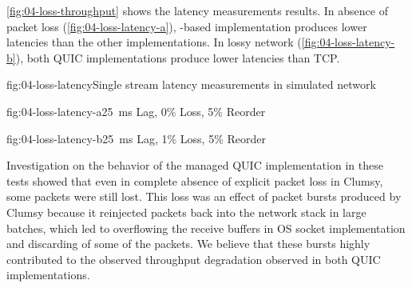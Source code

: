\autoref{fig:04-loss-throughput} shows the latency measurements results. In absence of packet loss
(\autoref{fig:04-loss-latency-a}), \libmsquic{}-based implementation produces lower latencies than
the other implementations. In lossy network (\autoref{fig:04-loss-latency-b}), both QUIC
implementations produce lower latencies than TCP\@.

\begin{myFigure}{fig:04-loss-latency}{Single stream latency measurements in simulated network}
\begin{mySubfigure}{0.49\linewidth}{fig:04-loss-latency-a}{\SI{25}{\milli\second} Lag, 0\% Loss, 5\% Reorder}
\footnotesize

\end{mySubfigure}
\begin{mySubfigure}{0.49\linewidth}{fig:04-loss-latency-b}{\SI{25}{\milli\second} Lag, 1\% Loss, 5\% Reorder}
\footnotesize

\end{mySubfigure}
\end{myFigure}

Investigation on the behavior of the managed QUIC implementation in these tests showed that even in
complete absence of explicit packet loss in Clumsy, some packets were still lost. This loss was an
effect of packet bursts produced by Clumsy because it reinjected packets back into the network stack
in large batches, which led to overflowing the receive buffers in OS socket implementation and
discarding of some of the packets. We believe that these bursts highly contributed to the observed
throughput degradation observed in both QUIC implementations.






